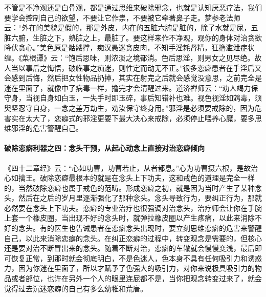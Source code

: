不管是不净观还是白骨观，都是通过思维来破除邪念，也就是认知厌恶疗法，我们要学会控制自己的欲望，不要让它作祟，不要被它牵著鼻子走。梦参老法师云：“外在的美貌是假的，那是外皮，内在的五脏六腑是脏的，除了水就是尿，五脏六腑，生脏之下，熟脏之上，最脏了。要这样来作不净观，观你的身体对治贪欲降伏贪心。”美色原是骷髅撑，痴汉愚迷贪皮肉，不知手淫耗肾精，狂撸滥泄症状缠。《菜根谭》云：“饱后思味，则浓淡之境都消。色后思淫，则男女之见尽绝。故人当以事后之悔悟，破临事之痴迷，则性定而动无不正。”很多恋癖患者在手淫后又会感到后悔，然后把女性物品扔掉，其实在射完之后就会感觉没意思，之前完全是迷在里面了，就像中了病毒一样，撸完才会清醒过来。道济禅师云：“劝人竭力保守身，当视自身如白玉，一失手时即玉碎，事后知错补也难。视色视淫如鸩毒，须臾坚忍守自身，一念之差万劫生，劝汝保守终身用。”邪淫是必须要戒除的，因为危害实在太大了，恋癖式的邪淫更要下最大决心来戒除，必须停止喂养心魔，要多思维邪淫的危害警醒自己。

\paragraph{破除恋癖利器之四：念头干预，从起心动念上直接对治恋癖倾向}

《四十二章经》云：“心如功曹，功曹若止，从者都息。”心为功曹摄六根，是故治心如擒王。破除恋癖最根本的就是在念头上下功夫，这和戒色的道理是完全一样的，当然破除恋癖也属于戒色的范畴。形成恋癖之初，就是因为当时产生了某种念头，然后在之后的岁月里逐渐强化了那种念头。念头导致行为，要纠正行为，那就必然要在念头上下功夫。恋癖的专业治疗也很强调对治念头，治疗师会让你在手腕上套一个橡皮圈，当出现不好的念头时，就弹拉橡皮圈以产生疼痛，以此来消除不好的念头。有的医生也告诫患者在恋癖念头出现时，要立刻思维恋癖的危害来警醒自己，以此来消除恋癖的念头。在纠正恋癖的过程中，转变观念是需要的，但核心还是要对治不断冒出来的念头。随着不断对治，恋癖的车辙就会慢慢变浅，最后即可恢复正常，到那时就会彻底明白，不是色迷人，色本身不具有任何吸引力和诱惑力，因为你迷在里面了，所以才赋予了色强大的吸引力，对你来说极具吸引力的物品或者部位，也许在另外一个人的眼里连屁都不是，当你把观念转变过来了，就会觉得过去沉迷恋癖的自己有多么幼稚和荒唐。


